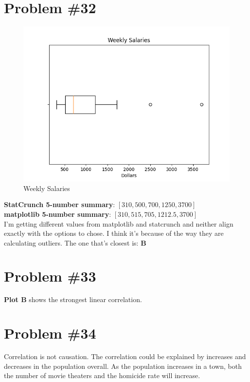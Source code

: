 \documentclass[12pt,fleqn]{article}
\newcommand{\problem}[1]{\vspace{5ex}\section*{Problem \##1}}
\begin{document}
\problem{32}
\begin{figure}[ht]
  \centering
  \includegraphics[width=12cm]{assets/weekly-salaries.png}
  \caption{Weekly Salaries}
\end{figure}
\textbf{StatCrunch 5-number summary}: $[310, 500, 700, 1250, 3700]$ \\
\textbf{matplotlib 5-number summary}: $[310, 515, 705, 1212.5, 3700]$ \\

I'm getting different values from matplotlib and statcrunch and neither align exactly with the options to chose. I think it's because of the way they are calculating outliers. The one that's closest is: \textbf{B}


\problem{33}
\textbf{Plot B} shows the strongest linear correlation.


\problem{34}
Correlation is not causation. The correlation could be explained by increases and decreases in the population overall. As the population increases in a town, both the number of movie theaters and the homicide rate will increase.
\end{document}
